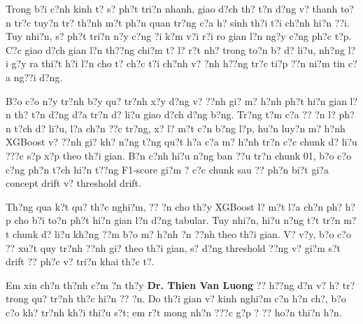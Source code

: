 Trong b?i c?nh kinh t? s? ph?t tri?n nhanh, giao d?ch th? t?n d?ng v? thanh to?n tr?c tuy?n tr? th?nh m?t ph?n quan tr?ng c?a h? sinh th?i t?i ch?nh hi?n ??i. Tuy nhi?n, s? ph?t tri?n n?y c?ng ?i k?m v?i r?i ro gian l?n ng?y c?ng ph?c t?p. C?c giao d?ch gian l?n th??ng chi?m t? l? r?t nh? trong to?n b? d? li?u, nh?ng l?i g?y ra thi?t h?i l?n cho t? ch?c t?i ch?nh v? ?nh h??ng tr?c ti?p ??n ni?m tin c?a ng??i d?ng.

B?o c?o n?y tr?nh b?y qu? tr?nh x?y d?ng v? ??nh gi? m? h?nh ph?t hi?n gian l?n th? t?n d?ng d?a tr?n d? li?u giao d?ch d?ng b?ng. Tr?ng t?m c?a ?? ?n l? ph?n t?ch d? li?u, l?a ch?n ??c tr?ng, x? l? m?t c?n b?ng l?p, hu?n luy?n m? h?nh XGBoost v? ??nh gi? kh? n?ng t?ng qu?t h?a c?a m? h?nh tr?n c?c chunk d? li?u ???c s?p x?p theo th?i gian. B?n c?nh hi?u n?ng ban ??u tr?n chunk 01, b?o c?o c?ng ph?n t?ch hi?n t??ng F1-score gi?m ? c?c chunk sau ?? ph?n bi?t gi?a concept drift v? threshold drift.

Th?ng qua k?t qu? th?c nghi?m, ?? ?n cho th?y XGBoost l? m?t l?a ch?n ph? h?p cho b?i to?n ph?t hi?n gian l?n d?ng tabular. Tuy nhi?n, hi?u n?ng t?t tr?n m?t chunk d? li?u kh?ng ??m b?o m? h?nh ?n ??nh theo th?i gian. V? v?y, b?o c?o ?? xu?t quy tr?nh ??nh gi? theo th?i gian, s? d?ng threshold ??ng v? gi?m s?t drift ?? ph?c v? tri?n khai th?c t?.

Em xin ch?n th?nh c?m ?n th?y \textbf{Dr. Thien Van Luong} ?? h??ng d?n v? h? tr? trong qu? tr?nh th?c hi?n ?? ?n. Do th?i gian v? kinh nghi?m c?n h?n ch?, b?o c?o kh? tr?nh kh?i thi?u s?t; em r?t mong nh?n ???c g?p ? ?? ho?n thi?n h?n.
